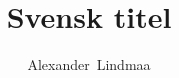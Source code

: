 \documentclass[a4paper,english,10pt,ifm,crop]{liuthesis}
\author{Alexander~Lindmaa}
\title{Svensk titel}{English title}
\begin{document}
\makeFrontMatter





% 
% 






\end{document}
